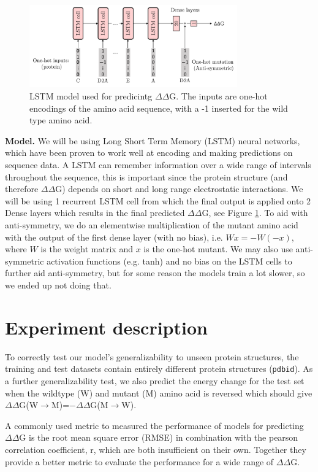 \documentclass{article}
\newcommand{\dd}{$\Delta\Delta$}
\begin{document}
\begin{figure}[!htb]
    \centering
    \includegraphics[width=0.8\textwidth]{lstm.pdf}
    \caption{\label{fig:lstm}LSTM model used for predicintg $\Delta\Delta$G. The inputs are one-hot encodings of the amino acid sequence, with a -1 inserted for the wild type amino acid.}
\end{figure}
\FloatBarrier

\textbf{Model.} We will be using Long Short Term Memory (LSTM) neural networks, which have been proven to work well at encoding and making predictions on sequence data. A LSTM can remember information over a wide range of intervals throughout the sequence, this is important since the protein structure (and therefore $\Delta\Delta$G) depends on short and long range electrostatic interactions. We will be using 1 recurrent LSTM cell from which the final output is applied onto 2 Dense layers which results in the final predicted $\Delta\Delta$G, see Figure \ref{fig:lstm}. To aid with anti-symmetry, we do an elementwise multiplication of the mutant amino acid with the output of the first dense layer (with no bias), i.e. $Wx = -W(-x)$, where $W$ is the weight matrix and $x$ is the one-hot mutant. We may also use anti-symmetric activation functions (e.g. tanh) and no bias on the LSTM cells to further aid anti-symmetry, but for some reason the models train a lot slower, so we ended up not doing that.

\section{Experiment description}

To correctly test our model's generalizability to unseen protein structures, the training and test datasets contain entirely different protein structures (\texttt{pdbid}). As a further generalizability test, we also predict the energy change for the test set when the wildtype (W) and mutant (M) amino acid is reversed which should give \dd G(W$\rightarrow$M)=$-$\dd G(M$\rightarrow$W).

A commonly used metric to measured the performance of models for predicting \dd G is the root mean square error (RMSE) in combination with the pearson correlation coefficient, r, which are both insufficient on their own. Together they provide a better metric to evaluate the performance for a wide range of \dd G.
\end{document}
